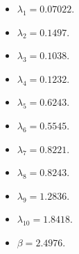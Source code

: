 \documentclass{article}
\begin{document}
\begin{enumerate}
    \begin{itemize}
        \item $\lambda_1 = 0.07022$.
        \item $\lambda_2 = 0.1497$.
        \item $\lambda_3 = 0.1038$.
        \item $\lambda_4 = 0.1232$.
        \item $\lambda_5 = 0.6243$.
        \item $\lambda_6 = 0.5545$.
        \item $\lambda_7 = 0.8221$.
        \item $\lambda_8 = 0.8243$.
        \item $\lambda_9 = 1.2836$.
        \item $\lambda_{10} = 1.8418$.
        \item $\beta = 2.4976$.
    \end{itemize}





   
\end{enumerate}




 
\end{document}
